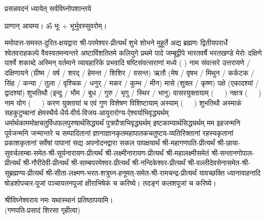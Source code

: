 
\setlength{\parindent}{0pt}

% 


{प्रसन्नवदनं ध्यायेत् सर्वविघ्नोपशान्तये}

प्राणान् आयम्य। ॐ भूः + भूर्भुवस्सुवरोम्।


ममोपात्त-समस्त-दुरित-क्षयद्वारा श्री-परमेश्वर-प्रीत्यर्थं शुभे शोभने मुहूर्ते अद्य ब्रह्मणः
द्वितीयपरार्धे श्वेतवराहकल्पे वैवस्वतमन्वन्तरे अष्टाविंशतितमे कलियुगे प्रथमे पादे
जम्बूद्वीपे भारतवर्षे भरतखण्डे मेरोः दक्षिणे पार्श्वे शकाब्दे अस्मिन् वर्तमाने व्यावहारिके
प्रभवादि षष्टिसंवत्सराणां मध्ये (	) नाम संवत्सरे उत्तरायणे / दक्षिणायने 
(ग्रीष्म / वर्ष / शरद् / हेमन्त / शिशिर / वसन्त) ऋतौ (मेष / वृषभ / मिथुन / कर्कटक / सिंह / कन्या / तुला / 
वृश्चिक / धनुर् / मकर / कुम्भ / मीन) मासे (शुक्ल / कृष्ण) पक्षे (एकादश्यां / द्वादश्यां) शुभतिथौ
(इन्दु / भौम / बुध / गुरु / भृगु / स्थिर / भानु) वासरयुक्तायाम्
\mbox{(~~~)} नक्षत्र \mbox{(~~~)} नाम योग \mbox{(~~~)} करण युक्तायां च एवं गुण विशेषण विशिष्टायाम्
अस्याम् \mbox{(~~~)} शुभतिथौ 
अस्माकं सहकुटुम्बानां क्षेमस्थैर्य-धैर्य-वीर्य-विजय-आयुरारोग्य-ऐश्वर्याभिवृद्ध्यर्थम्
धर्मार्थकाममोक्ष\-चतुर्विधफलपुरुषार्थसिद्ध्यर्थं पुत्रपौत्राभि\-वृद्ध्यर्थम् इष्टकाम्यार्थसिद्ध्यर्थम्
मम इहजन्मनि पूर्वजन्मनि जन्मान्तरे च सम्पादितानां ज्ञानाज्ञानकृतमहा\-पातकचतुष्टय-व्यतिरिक्तानां रहस्यकृतानां प्रकाशकृतानां सर्वेषां पापानां सद्य अपनोदनद्वारा सकल पापक्षयार्थं
श्री-महागणपति-प्रीत्यर्थं श्री-छाया-सुवर्चलाम्बा-समेत-श्री-सूर्यनारायण-प्रीत्यर्थं श्री-लक्ष्मीनारायण-प्रीत्यर्थं 
श्री-महालक्ष्मीसमेतं श्री-सन्तानगोपाल-प्रीत्यर्थं श्री-गौरीदेवी-प्रीत्यर्थं श्री-साम्बपरमेश्वर-प्रीत्यर्थं श्री-नन्दिकेश्वर-प्रीत्यर्थं 
श्री-वल्लीदेवसेनासमेत-श्री-सुब्रह्मण्य-प्रीत्यर्थं श्री-सीता-लक्ष्मण-भरत-शत्रुघ्न-हनूमत्-समेत-श्री-रामचन्द्र-प्रीत्यर्थं 
यावच्छक्ति ध्यानावाहनादि षोडशोपचार-पूजां पञ्चायतनपूजां क्षीराभिषेकं च करिष्ये। तदङ्गं कलशपूजां च करिष्ये।


श्रीविघ्नेश्वराय नमः यथास्थानं प्रतिष्ठापयामि।\\
(गणपति-प्रसादं शिरसा गृहीत्वा)





